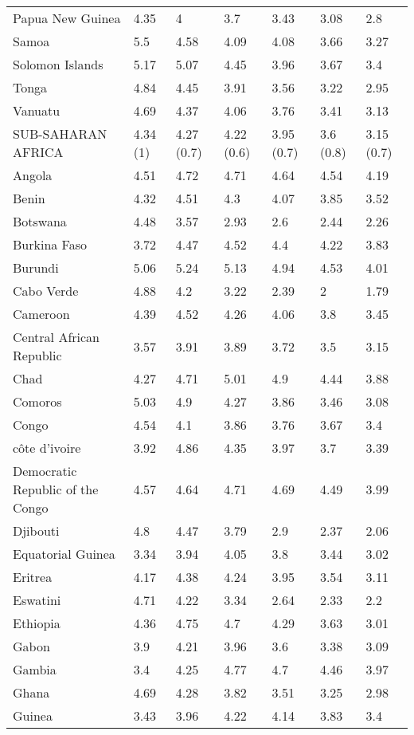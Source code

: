 \begin{longtable}[t]{lllllll}
Papua New Guinea & 4.35 & 4 & 3.7 & 3.43 & 3.08 & 2.8\\
Samoa & 5.5 & 4.58 & 4.09 & 4.08 & 3.66 & 3.27\\
Solomon Islands & 5.17 & 5.07 & 4.45 & 3.96 & 3.67 & 3.4\\
Tonga & 4.84 & 4.45 & 3.91 & 3.56 & 3.22 & 2.95\\
Vanuatu & 4.69 & 4.37 & 4.06 & 3.76 & 3.41 & 3.13\\
SUB-SAHARAN AFRICA & 4.34 (1) & 4.27 (0.7) & 4.22 (0.6) & 3.95 (0.7) & 3.6 (0.8) & 3.15 (0.7)\\
Angola & 4.51 & 4.72 & 4.71 & 4.64 & 4.54 & 4.19\\
Benin & 4.32 & 4.51 & 4.3 & 4.07 & 3.85 & 3.52\\
Botswana & 4.48 & 3.57 & 2.93 & 2.6 & 2.44 & 2.26\\
Burkina Faso & 3.72 & 4.47 & 4.52 & 4.4 & 4.22 & 3.83\\
Burundi & 5.06 & 5.24 & 5.13 & 4.94 & 4.53 & 4.01\\
Cabo Verde & 4.88 & 4.2 & 3.22 & 2.39 & 2 & 1.79\\
Cameroon & 4.39 & 4.52 & 4.26 & 4.06 & 3.8 & 3.45\\
Central African Republic & 3.57 & 3.91 & 3.89 & 3.72 & 3.5 & 3.15\\
Chad & 4.27 & 4.71 & 5.01 & 4.9 & 4.44 & 3.88\\
Comoros & 5.03 & 4.9 & 4.27 & 3.86 & 3.46 & 3.08\\
Congo & 4.54 & 4.1 & 3.86 & 3.76 & 3.67 & 3.4\\
côte d'ivoire & 3.92 & 4.86 & 4.35 & 3.97 & 3.7 & 3.39\\
Democratic Republic of the Congo & 4.57 & 4.64 & 4.71 & 4.69 & 4.49 & 3.99\\
Djibouti & 4.8 & 4.47 & 3.79 & 2.9 & 2.37 & 2.06\\
Equatorial Guinea & 3.34 & 3.94 & 4.05 & 3.8 & 3.44 & 3.02\\
Eritrea & 4.17 & 4.38 & 4.24 & 3.95 & 3.54 & 3.11\\
Eswatini & 4.71 & 4.22 & 3.34 & 2.64 & 2.33 & 2.2\\
Ethiopia & 4.36 & 4.75 & 4.7 & 4.29 & 3.63 & 3.01\\
Gabon & 3.9 & 4.21 & 3.96 & 3.6 & 3.38 & 3.09\\
Gambia & 3.4 & 4.25 & 4.77 & 4.7 & 4.46 & 3.97\\
Ghana & 4.69 & 4.28 & 3.82 & 3.51 & 3.25 & 2.98\\
Guinea & 3.43 & 3.96 & 4.22 & 4.14 & 3.83 & 3.4\\

\end{longtable}
